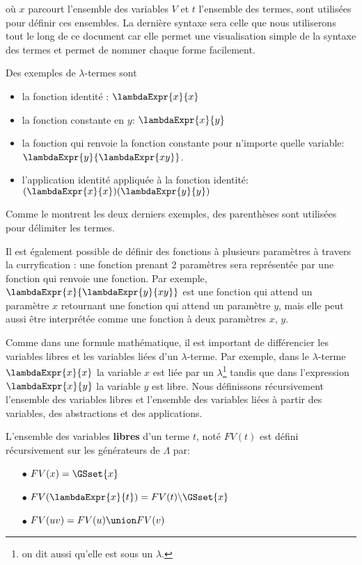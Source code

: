 où $x$ parcourt l'ensemble des variables $V$ et $t$ l'ensemble des termes, sont
utilisées pour définir ces ensembles. La dernière syntaxe sera celle que nous
utiliserons tout le long de ce document car elle permet une visualisation simple
de la syntaxe des termes et permet de nommer chaque forme facilement.

Des exemples de $\lambda$-termes sont
\begin{itemize}
  \item la fonction identité : $\lambdaExpr{x}{x}$
  \item la fonction constante en $y$: $\lambdaExpr{x}{y}$
  \item la fonction qui renvoie la fonction constante pour n'importe quelle
    variable: $\lambdaExpr{y}{\lambdaExpr{x y}}$.
  \item l'application identité appliquée à la fonction identité:
    $(\lambdaExpr{x}{x}) (\lambdaExpr{y}{y})$
\end{itemize}

Comme le montrent les deux derniers exemples, des parenthèses sont utilisées pour
délimiter les termes.

Il est également possible de définir des fonctions à plusieurs paramètres à
travers la curryfication : une fonction prenant 2 paramètres sera représentée
par une fonction qui renvoie une fonction. Par exemple,
$\lambdaExpr{x}{\lambdaExpr{y}{x y}}$ est une fonction qui attend un paramètre
$x$ retournant une fonction qui attend un paramètre $y$,
mais elle peut aussi être interprétée comme une fonction à deux paramètres $x$, $y$.

Comme dans une formule mathématique, il est important de différencier les
variables libres et les variables liées d'un $\lambda$-terme. Par exemple, dans
le $\lambda$-terme $\lambdaExpr{x}{x}$ la variable $x$ est liée par un
$\lambda$\footnote{on dit aussi qu'elle est \og sous \fg un $\lambda$.}
tandis que dans l'expression $\lambdaExpr{x}{y}$ la variable $y$ est libre.
Nous définissons récursivement l'ensemble des variables libres et l'ensemble des
variables liées à partir des variables, des abstractions et des applications.

\begin{definition} 
  L'ensemble des variables \textbf{libres} d'un terme $t$, noté $FV(t)$ est défini
  récursivement sur les générateurs de $\Lambda$ par:
  \begin{itemize}
  \item[$\bullet$] $FV(x) = \GSset{x}$
  \item[$\bullet$] $FV(\lambdaExpr{x}{t}) = FV(t) \backslash \GSset{x}$
  \item[$\bullet$] $FV(u v) = FV(u) \union FV(v)$
  \end{itemize}
\end{definition}

